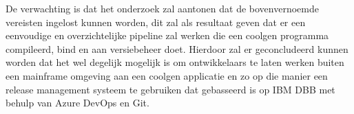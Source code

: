 De verwachting is dat het onderzoek zal aantonen dat de bovenvernoemde vereisten ingelost kunnen worden, dit zal als resultaat geven dat er een eenvoudige en overzichtelijke pipeline zal 
werken die een coolgen programma compileerd, bind en aan versiebeheer doet. 
Hierdoor zal er geconcludeerd kunnen worden dat het wel degelijk mogelijk is om ontwikkelaars te laten werken buiten een mainframe omgeving aan een coolgen applicatie en zo op die manier een 
release management systeem te gebruiken dat gebasseerd is op IBM DBB met behulp van Azure DevOps en Git.
